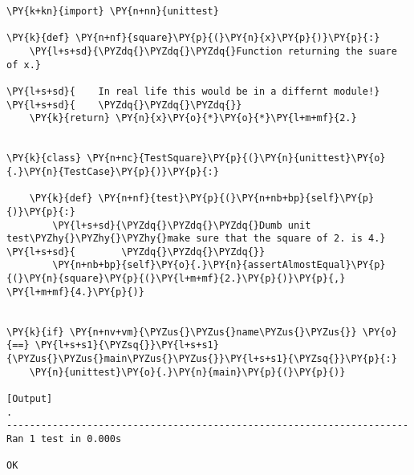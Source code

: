 \begin{Verbatim}[label=\makebox{\url{https://github.com/lucabaldini/cmepda/tree/master/slides/latex/snippets/unit\_test.py}},commandchars=\\\{\}]
\PY{k+kn}{import} \PY{n+nn}{unittest}

\PY{k}{def} \PY{n+nf}{square}\PY{p}{(}\PY{n}{x}\PY{p}{)}\PY{p}{:}
    \PY{l+s+sd}{\PYZdq{}\PYZdq{}\PYZdq{}Function returning the suare of x.}

\PY{l+s+sd}{    In real life this would be in a differnt module!}
\PY{l+s+sd}{    \PYZdq{}\PYZdq{}\PYZdq{}}
    \PY{k}{return} \PY{n}{x}\PY{o}{*}\PY{o}{*}\PY{l+m+mf}{2.}


\PY{k}{class} \PY{n+nc}{TestSquare}\PY{p}{(}\PY{n}{unittest}\PY{o}{.}\PY{n}{TestCase}\PY{p}{)}\PY{p}{:}

    \PY{k}{def} \PY{n+nf}{test}\PY{p}{(}\PY{n+nb+bp}{self}\PY{p}{)}\PY{p}{:}
        \PY{l+s+sd}{\PYZdq{}\PYZdq{}\PYZdq{}Dumb unit test\PYZhy{}\PYZhy{}\PYZhy{}make sure that the square of 2. is 4.}
\PY{l+s+sd}{        \PYZdq{}\PYZdq{}\PYZdq{}}
        \PY{n+nb+bp}{self}\PY{o}{.}\PY{n}{assertAlmostEqual}\PY{p}{(}\PY{n}{square}\PY{p}{(}\PY{l+m+mf}{2.}\PY{p}{)}\PY{p}{,} \PY{l+m+mf}{4.}\PY{p}{)}


\PY{k}{if} \PY{n+nv+vm}{\PYZus{}\PYZus{}name\PYZus{}\PYZus{}} \PY{o}{==} \PY{l+s+s1}{\PYZsq{}}\PY{l+s+s1}{\PYZus{}\PYZus{}main\PYZus{}\PYZus{}}\PY{l+s+s1}{\PYZsq{}}\PY{p}{:}
    \PY{n}{unittest}\PY{o}{.}\PY{n}{main}\PY{p}{(}\PY{p}{)}

[Output]
.
----------------------------------------------------------------------
Ran 1 test in 0.000s

OK
\end{Verbatim}